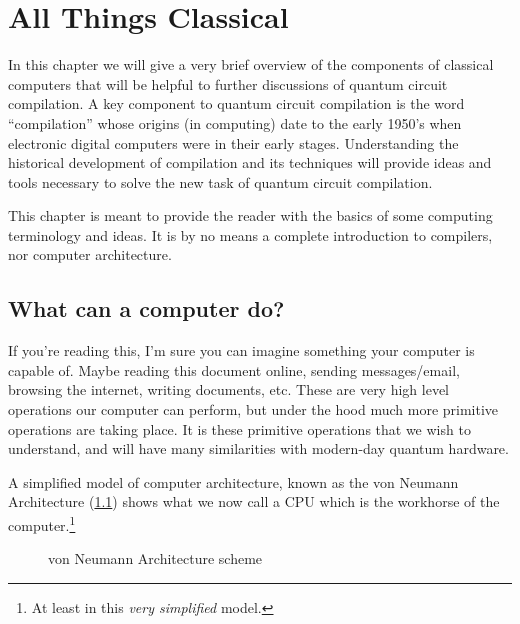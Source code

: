 \chapter{All Things Classical}\label{chap:compilers}

In this chapter we will give a very brief overview of the components of classical computers that will be helpful to further discussions of quantum circuit compilation.
A key component to quantum circuit compilation is the word ``compilation'' whose origins (in computing) date to the early 1950's when electronic digital computers were in their early stages.
Understanding the historical development of compilation and its techniques will provide ideas and tools necessary to solve the new task of quantum circuit compilation.

This chapter is meant to provide the reader with the basics of some computing terminology and ideas.
It is by no means a complete introduction to compilers, nor computer architecture.

\section{What can a computer do?}

If you're reading this, I'm sure you can imagine something your computer is capable of.
Maybe reading this document online, sending messages/email, browsing the internet, writing documents, etc.
These are very high level operations our computer can perform, but under the hood much more primitive operations are taking place.
It is these primitive operations that we wish to understand, and will have many similarities with modern-day quantum hardware.

A simplified model of computer architecture, known as the von Neumann Architecture (\cref{fig:comparch}) shows what we now call a \ac{CPU} which is the workhorse of the computer.\footnote{At least in this \emph{very simplified} model.}

\begin{figure}[h]
    \centering
    
    \caption{von Neumann Architecture scheme}\label{fig:comparch}
\end{figure}

